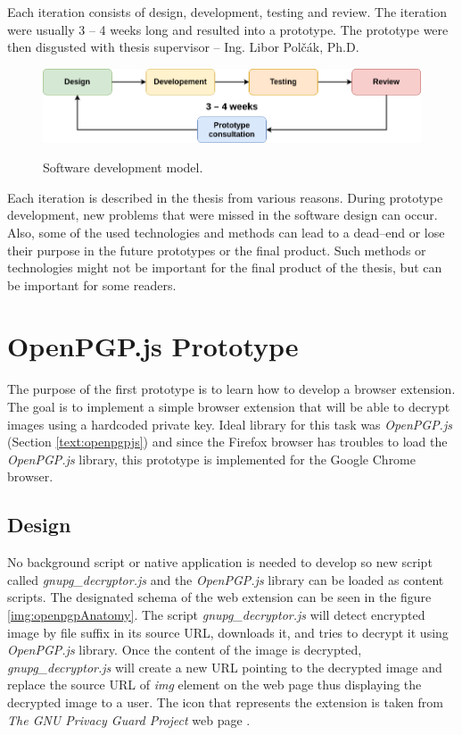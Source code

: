 Each iteration consists of design, development, testing and review. The iteration were usually 3 -- 4 weeks long and resulted into a prototype. The prototype were then disgusted with thesis supervisor -- Ing. Libor Polčák, Ph.D.

\begin{figure}[H]
    \begin{center}
        \label{img:extensionAnatomy}
        \includegraphics[width=1.0\textwidth]{obrazky-figures/developementModel.png}
        \caption{Software development model.}
    \end{center}
\end{figure}

Each iteration is described in the thesis from various reasons. During prototype development, new problems that were missed in the software design can occur. Also, some of the used technologies and methods can lead to a dead--end or lose their purpose in the future prototypes or the final product. Such methods or technologies might not be important for the final product of the thesis, but can be important for some readers.

\section{OpenPGP.js Prototype}
\label{prototype:OpenPGPjs}
The purpose of the first prototype is to learn how to develop a browser extension. The goal is to implement a simple browser extension that will be able to decrypt images using a hardcoded private key. Ideal library for this task was \textit{OpenPGP.js} (Section \ref{text:openpgpjs}) and since the Firefox browser has troubles to load the \textit{OpenPGP.js} library, this prototype is implemented for the Google Chrome browser.

\subsection{Design}
No background script or native application is needed to develop so new script called \textit{gnupg\_decryptor.js} and the \textit{OpenPGP.js} library can be loaded as content scripts. The designated schema of the web extension can be seen in the figure \ref{img:openpgpAnatomy}. The script \textit{gnupg\_decryptor.js} will detect encrypted image by file suffix in its source URL, downloads it, and tries to decrypt it using \textit{OpenPGP.js} library. Once the content of the image is decrypted, \textit{gnupg\_decryptor.js} will create a new URL pointing to the decrypted image and replace the source URL of \textit{img} element on the web page thus displaying the decrypted image to a user. The icon that represents the extension is taken from \textit{The GNU Privacy Guard Project} web page \cite{GnuPG}.

